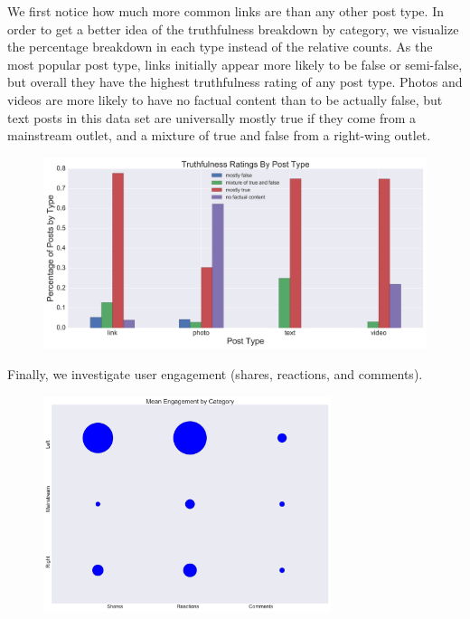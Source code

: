 \documentclass[12pt]{article}
\begin{document}
We first notice how much more common links are than any other post type. In order to get a better idea of the truthfulness breakdown by category, we visualize the percentage breakdown in each type instead of the relative counts. As the most popular post type, links initially appear more likely to be false or semi-false, but overall they have the highest truthfulness rating of any post type. Photos and videos are more likely to have no factual content than to be actually false, but text posts in this data set are universally mostly true if they come from a mainstream outlet, and a mixture of true and false from a right-wing outlet.
\begin{figure}[H] 
    \centering
    \includegraphics[width=\textwidth]{ratings_distribution_by_type.png}
\end{figure}

Finally, we investigate user engagement (shares, reactions, and comments).


\begin{figure}[H] 
    \centering
    \includegraphics[width=0.75\textwidth]{engagement_by_category.png}
\end{figure}
\end{document}
